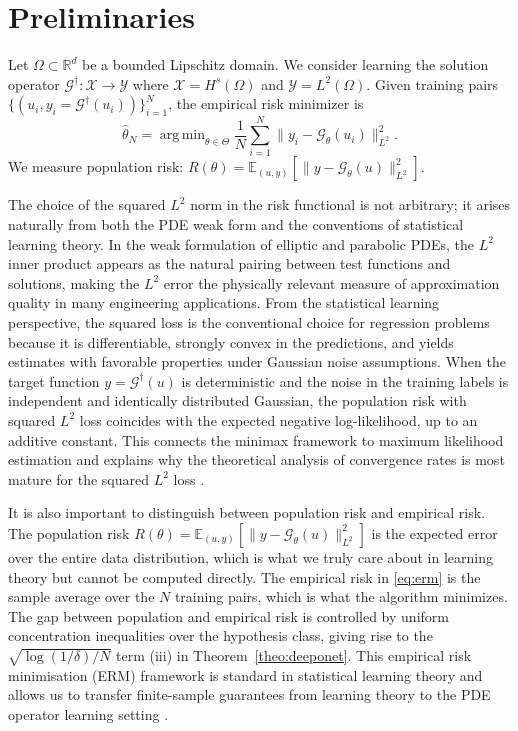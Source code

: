 \documentclass[12pt,a4paper]{article}
\def\reals{{\mathbb R}}
\def\EE{{\mathbb E}}
\DeclareMathOperator*{\argmin}{arg\,min}
\begin{document}
\section{Preliminaries}
\label{sec:prelim}

Let $\Omega \subset \reals^d$ be a bounded Lipschitz domain.
We consider learning the solution operator
$\mathcal{G}^\dagger: \mathcal{X} \to \mathcal{Y}$ where
$\mathcal{X} = H^s(\Omega)$ and $\mathcal{Y} = L^2(\Omega)$.
Given training pairs $\{(u_i, y_i = \mathcal{G}^\dagger(u_i))\}_{i=1}^N$,
the empirical risk minimizer is
\begin{equation}
    \hat\theta_N = \argmin_{\theta \in \Theta}
    \frac{1}{N}\sum_{i=1}^N \|y_i - \mathcal{G}_\theta(u_i)\|_{L^2}^2.
    \label{eq:erm}
\end{equation}
We measure population risk:
$R(\theta) = \EE_{(u,y)}[\|y - \mathcal{G}_\theta(u)\|_{L^2}^2]$.

The choice of the squared $L^2$ norm in the risk functional is not arbitrary;
it arises naturally from both the PDE weak form and the conventions of
statistical learning theory.  In the weak formulation of elliptic and parabolic
PDEs, the $L^2$ inner product appears as the natural pairing between test
functions and solutions, making the $L^2$ error the physically relevant measure
of approximation quality in many engineering applications.  From the statistical
learning perspective, the squared loss is the conventional choice for regression
problems because it is differentiable, strongly convex in the predictions, and
yields estimates with favorable properties under Gaussian noise assumptions.
When the target function $y = \mathcal{G}^\dagger(u)$ is deterministic and the
noise in the training labels is independent and identically distributed Gaussian,
the population risk with squared $L^2$ loss coincides with the expected
negative log-likelihood, up to an additive constant.  This connects the
minimax framework to maximum likelihood estimation and explains why the
theoretical analysis of convergence rates is most mature for the squared $L^2$
loss \citep{wainwright2019high,shalev2014understanding}.

It is also important to distinguish between population risk and empirical risk.
The population risk $R(\theta) = \EE_{(u,y)}[\|y - \mathcal{G}_\theta(u)\|_{L^2}^2]$
is the expected error over the entire data distribution, which is what we truly
care about in learning theory but cannot be computed directly.  The empirical risk
in \eqref{eq:erm} is the sample average over the $N$ training pairs, which is
what the algorithm minimizes.  The gap between population and empirical risk
is controlled by uniform concentration inequalities over the hypothesis class,
giving rise to the $\sqrt{\log(1/\delta)/N}$ term (iii) in Theorem~\ref{theo:deeponet}.
This empirical risk minimisation (ERM) framework is standard in statistical
learning theory and allows us to transfer finite-sample guarantees from
learning theory to the PDE operator learning setting \citep{golowich2018size,
massart2000rademacher}.
\end{document}
